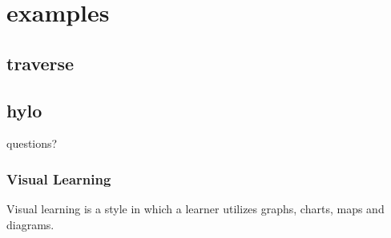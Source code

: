 \documentclass[include/preamble.tex]{subfiles}
\begin{document}
\section{examples}
\subsection{traverse}


\subsection{hylo}







{
  \begin{frame}
    \begin{center}
      questions?
    \end{center}
  \end{frame}
}




\begin{frame}
  \frametitle{Visual Learning}
  \begin{displayquote}
    Visual learning is a style in which a learner
    utilizes graphs, charts, maps and diagrams.
  \end{displayquote}
\end{frame}
\end{document}
